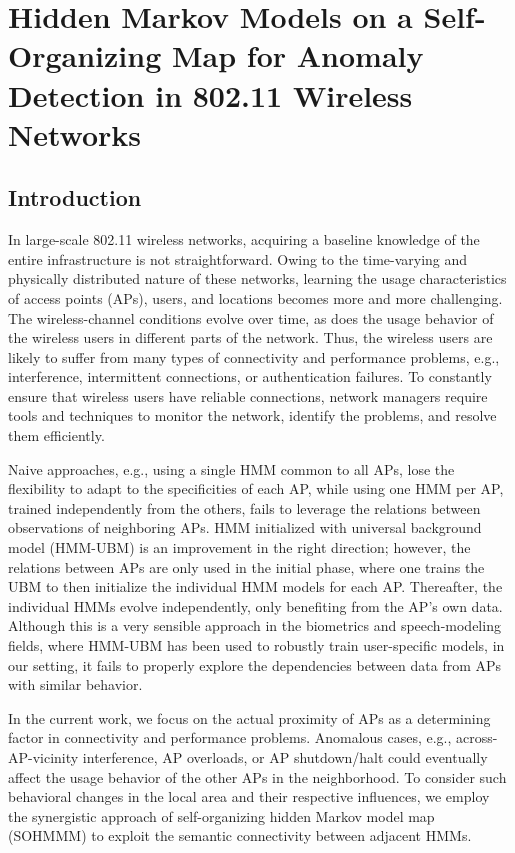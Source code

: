 \section{Hidden Markov Models on a Self-Organizing Map for Anomaly Detection in 802.11 Wireless Networks}
\label{sec:sohmmm}

\subsection{Introduction}
\label{sec:sohmmm_intro}
In large-scale 802.11 wireless networks, acquiring a baseline knowledge of the entire infrastructure is not straightforward. Owing to the time-varying and physically distributed nature of these networks, learning the usage characteristics of access points (APs), users, and locations becomes more and more challenging. The wireless-channel conditions evolve over time, as does the usage behavior of the wireless users in different parts of the network. Thus, the wireless users are likely to suffer from many types of connectivity and performance problems, e.g., interference, intermittent connections, or authentication failures. To constantly ensure that wireless users have reliable connections, network managers require tools and techniques to monitor the network, identify the problems, and resolve them efficiently.

Naive approaches, e.g., using a single HMM common to all APs, lose the flexibility to adapt to the specificities of each AP, while using one HMM per AP, trained independently from the others, fails to leverage the relations between observations of neighboring APs. HMM initialized with universal background model (HMM-UBM) \cite{Anisa2017} is an improvement in the right direction; however, the relations between APs are only used in the initial phase, where one trains the UBM to then initialize the individual HMM models for each AP. Thereafter, the individual HMMs evolve independently, only benefiting from the AP's own data. Although this is a very sensible approach in the biometrics and speech-modeling fields, where HMM-UBM has been used to robustly train user-specific models, in our setting, it fails to properly explore the dependencies between data from APs with similar behavior. 

In the current work, we focus on the actual proximity of APs as a determining factor in connectivity and performance problems. Anomalous cases, e.g., across-AP-vicinity interference, AP overloads, or AP shutdown/halt could eventually affect the usage behavior of the other APs in the neighborhood. To consider such behavioral changes in the local area and their respective influences, we employ the synergistic approach of self-organizing hidden Markov model map (SOHMMM) to exploit the semantic connectivity between adjacent HMMs.

